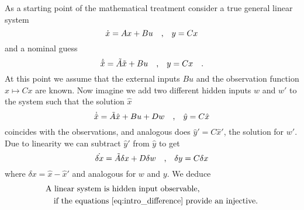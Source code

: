 As a starting point of the mathematical treatment consider a true general linear system
\begin{equation}
	\dot{x} = Ax + Bu \quad \text{,} \quad y=Cx
\end{equation}
and a nominal guess
\begin{equation}
	\dot{\tilde{x}} = \tilde{A}\tilde{x} + Bu \quad \text{,} \quad y=Cx \quad .
\end{equation}
At this point we assume that the external inputs $Bu$ and the observation function $x\mapsto Cx$ are known. Now 
imagine we add two different hidden inputs $w$ and $w'$ to the system such that the solution $\hat{x}$
\begin{equation}
	\dot{\hat{x}} = \tilde{A} \hat{x} + Bu + Dw \quad \text{,} \quad \hat{y} = C\hat{x}
\end{equation} 
coincides with the observations, and analogous does $\hat{y}'=C\hat{x}'$, the solution for $w'$. Due to 
linearity we can subtract $\hat{y}'$ from $\hat{y}$ to get
\begin{equation}
	\dot{\delta x} = \tilde{A} \delta x + D \delta w \quad \text{,} \quad \delta y = C \delta x \label{eq:intro_difference}
\end{equation}
where $\delta x=\hat{x}-\hat{x}'$ and analogous for $w$ and $y$. We deduce
\begin{equation*}
\begin{aligned}&
\text{A linear system is hidden input observable,}\\ &\quad 
\text{if the equations \eqref{eq:intro_difference} provide an injective.}
\end{aligned}
\end{equation*}
